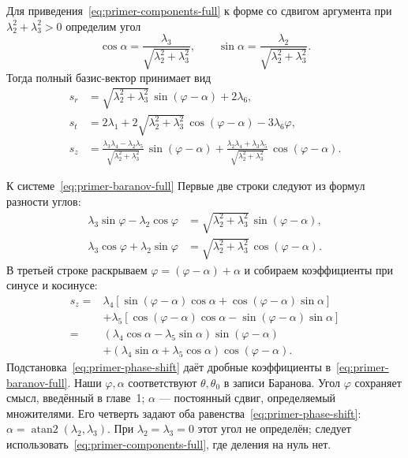 Для приведения~\eqref{eq:primer-components-full} к форме
со сдвигом аргумента при $\lambda_2^2+\lambda_3^2>0$ определим угол
\begin{equation}
 \cos\alpha=\frac{\lambda_3}{\sqrt{\lambda_2^2+\lambda_3^2}},
 \qquad
 \sin\alpha=\frac{\lambda_2}{\sqrt{\lambda_2^2+\lambda_3^2}}.
 \label{eq:primer-phase-shift}
\end{equation}
Тогда полный базис-вектор принимает вид
\begin{equation}
\boxed{\begin{aligned}
 s_r&=\sqrt{\lambda_2^2+\lambda_3^2}\,\sin(\varphi-\alpha)+2\lambda_6,\\
 s_t&=2\lambda_1+2\sqrt{\lambda_2^2+\lambda_3^2}\,
                       \cos(\varphi-\alpha)-3\lambda_6\varphi,\\
 s_z&=\frac{\lambda_3\lambda_4-\lambda_2\lambda_5}
                {\sqrt{\lambda_2^2+\lambda_3^2}}\,\sin(\varphi-\alpha)
       +\frac{\lambda_2\lambda_4+\lambda_3\lambda_5}
                {\sqrt{\lambda_2^2+\lambda_3^2}}\,\cos(\varphi-\alpha).
\end{aligned}}
\label{eq:primer-baranov-full}
\end{equation}
\begin{explanation}{К системе~\eqref{eq:primer-baranov-full}}
Первые две строки следуют из формул разности углов:
\[
\begin{aligned}
 \lambda_3\sin\varphi-\lambda_2\cos\varphi
     &=\sqrt{\lambda_2^2+\lambda_3^2}\,\sin(\varphi-\alpha),\\
 \lambda_3\cos\varphi+\lambda_2\sin\varphi
     &=\sqrt{\lambda_2^2+\lambda_3^2}\,\cos(\varphi-\alpha).
\end{aligned}
\]
В третьей строке раскрываем $\varphi=(\varphi-\alpha)+\alpha$
и собираем коэффициенты при синусе и косинусе:
\[
\begin{aligned}
 s_z={}&\lambda_4[\sin(\varphi-\alpha)\cos\alpha
                     +\cos(\varphi-\alpha)\sin\alpha]\\
       &+\lambda_5[\cos(\varphi-\alpha)\cos\alpha
                     -\sin(\varphi-\alpha)\sin\alpha]\\
   ={}&(\lambda_4\cos\alpha-\lambda_5\sin\alpha)\sin(\varphi-\alpha)\\
       &+(\lambda_4\sin\alpha+\lambda_5\cos\alpha)\cos(\varphi-\alpha).
\end{aligned}
\]
Подстановка~\eqref{eq:primer-phase-shift} даёт дробные коэффициенты
в~\eqref{eq:primer-baranov-full}.
Наши $\varphi,\alpha$ соответствуют $\theta,\theta_0$ в записи
Баранова. Угол $\varphi$ сохраняет смысл, введённый в главе~1;
$\alpha$ --- постоянный сдвиг, определяемый множителями.
Его четверть задают оба равенства~\eqref{eq:primer-phase-shift}:
$\alpha=\operatorname{atan2}(\lambda_2,\lambda_3)$.
При $\lambda_2=\lambda_3=0$ этот угол не определён;
следует использовать~\eqref{eq:primer-components-full},
где деления на нуль нет.
\end{explanation}

